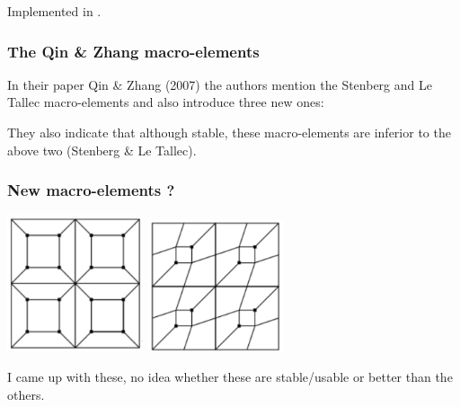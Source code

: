 Implemented in .

\subsubsection{The Qin \& Zhang macro-elements}

In their paper Qin \& Zhang (2007) \cite{qizh07} the authors mention the Stenberg and Le Tallec
macro-elements and also introduce three new ones:

\begin{minipage}{0.31\textwidth}

\end{minipage}\hfill 
\begin{minipage}{0.31\textwidth}

\end{minipage}\hfill 
\begin{minipage}{0.31\textwidth}

\end{minipage}

They also indicate that although stable, these macro-elements are inferior 
to the above two (Stenberg \& Le Tallec). 

\subsubsection{New macro-elements ?}

\begin{center}
\includegraphics[width=4cm]{images/meshtopos/m21}
\includegraphics[width=4cm]{images/meshtopos/m22}
\end{center}

I came up with these, no idea whether these are stable/usable or better than the others.






 

